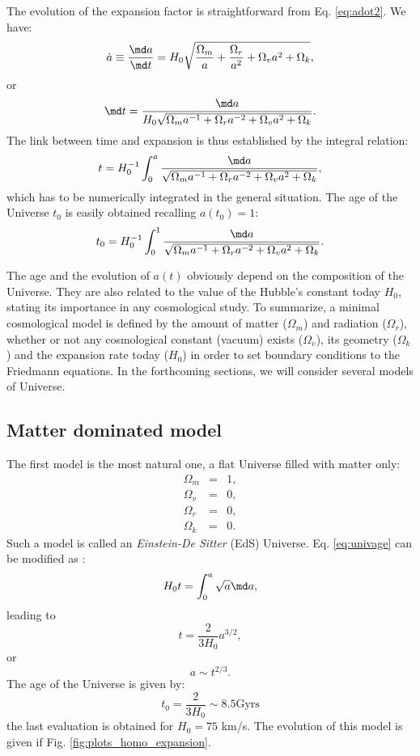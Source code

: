 The evolution of the expansion factor is straightforward from Eq. \ref{eq:adot2}. We have:
\begin{equation}
	{\dot a}\equiv\frac{\md a}{\md t}=H_0\sqrt{\frac{\Omega_m}{a}+\frac{\Omega_r}{a^2}+{\Omega_v}{a^2}+\Omega_k},
\end{equation}
or
\begin{equation}
	\md t=\frac{\md a}{H_0\sqrt{{\Omega_m}{a^{-1}}+{\Omega_r}{a^{-2}}+{\Omega_v}{a^2}+\Omega_k}}.
\end{equation}
The link between time and expansion is thus established by the integral relation:
\begin{equation}
	t=H_0^{-1}\int_0^a \frac{\md a}{\sqrt{{\Omega_m}{a^{-1}}+{\Omega_r}{a^{-2}}+{\Omega_v}{a^2}+\Omega_k}},
\end{equation}
which has to be numerically integrated in the general situation.
The age of the Universe $t_0$ is easily obtained recalling $a(t_0)=1$:
\begin{equation}
	t_0=H_0^{-1}\int_0^1 \frac{\md a}{\sqrt{{\Omega_m}{a^{-1}}+{\Omega_r}{a^{-2}}+{\Omega_v}{a^2}+\Omega_k}}.
	\label{eq:univage}
\end{equation}

The age and the evolution of $a(t)$ obviously depend on the composition of the Universe. They are also related to the value of the Hubble's constant today $H_0$, stating its importance in any cosmological study. To summarize, a minimal cosmological model is defined by the amount of matter ($\Omega_m$) and radiation ($\Omega_r$), whether or not any cosmological constant (vacuum) exists ($\Omega_v$), its geometry ($\Omega_k$) and the expansion rate today ($H_0$) in order to set boundary conditions to the Friedmann equations. 
In the forthcoming sections, we will consider several models of Universe.

\subsection{Matter dominated model} %
\label{sub:einstein_de_sitter_model}
The first model is the most natural one, a flat Universe filled with matter only:
\begin{eqnarray}
	\Omega_m&=&1,\\
	\Omega_v&=&0,\\
	\Omega_r&=&0,\\
	\Omega_k&=&0.
\end{eqnarray} 
Such a model is called an \emph{Einstein-De Sitter} (EdS) Universe. Eq. \ref{eq:univage} can be modified as :
\begin{equation}
	H_0t=\int_0^a \sqrt a \md a,
\end{equation}
leading to 
\begin{equation}
	t=\frac{2}{3H_0}a^{3/2},
\end{equation}
or
\begin{equation}
	a\sim t^{2/3}.
\end{equation}
The age of the Universe is given by:
\begin{equation}
	t_0=\frac{2}{3H_0}\sim8.5\mathrm{Gyrs}
\end{equation}
the last evaluation is obtained for $H_0=75$ km/s. The evolution of this model is given if Fig. \ref{fig:plots_homo_expansion}.

